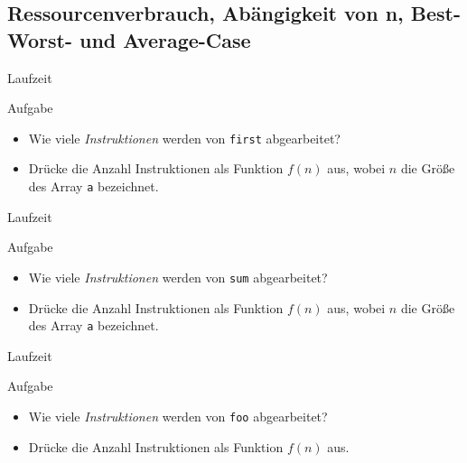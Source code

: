 \newcommand{\Rplus}{\ensuremath{\nR_+}}
\newcommand{\Rnullplus}{\ensuremath{\nR^+_0}}

\subsection{Ressourcenverbrauch, Abängigkeit von n, Best- Worst- und Average-Case}

\begin{frame}{Laufzeit}
    \centering 

    \begin{exampleblock}{Aufgabe}
        \begin{itemize}
            \item Wie viele \emph{Instruktionen} werden von \texttt{first} abgearbeitet?
            \item Drücke die Anzahl Instruktionen als Funktion $f(n)$ aus, wobei $n$ die Größe des Array \texttt{a} bezeichnet.
        \end{itemize}      
    \end{exampleblock}
\end{frame}

\begin{frame}{Laufzeit}
    \centering 

    \begin{exampleblock}{Aufgabe}
        \begin{itemize}
            \item Wie viele \emph{Instruktionen} werden von \texttt{sum} abgearbeitet?
            \item Drücke die Anzahl Instruktionen als Funktion $f(n)$ aus, wobei $n$ die Größe des Array \texttt{a} bezeichnet.
        \end{itemize}      
    \end{exampleblock}
\end{frame}

\begin{frame}{Laufzeit}
    \centering 

    \begin{exampleblock}{Aufgabe}
        \begin{itemize}
            \item Wie viele \emph{Instruktionen} werden von \texttt{foo} abgearbeitet?
            \item Drücke die Anzahl Instruktionen als Funktion $f(n)$ aus.
        \end{itemize}      
    \end{exampleblock}
\end{frame}

